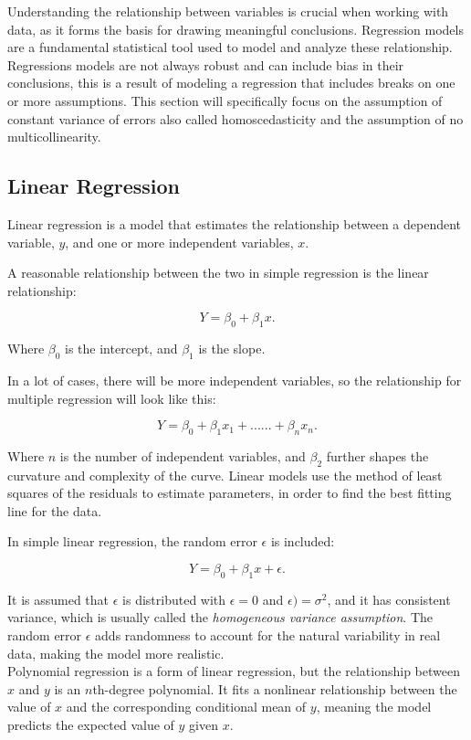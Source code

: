 Understanding the relationship between variables is crucial when working with data, as it forms the basis for drawing meaningful conclusions. Regression models are a fundamental statistical tool used to model and analyze these relationship. Regressions models are not always robust and can include bias in their conclusions, this is a result of modeling a regression that includes breaks on one or more assumptions. This section will specifically focus on the assumption of constant variance of errors also called homoscedasticity and the assumption of no multicollinearity.


\subsection{Linear Regression}
Linear regression is a model that estimates the relationship between a dependent variable, \( y \), and one or more independent variables, \( x \).

A reasonable relationship between the two in simple regression is the linear relationship:

\[
Y = \beta_0 + \beta_1 x.
\]

Where \( \beta_0 \) is the intercept, and \( \beta_1 \) is the slope.

In a lot of cases, there will be more independent variables, so the relationship for multiple regression will look like this:

\[
Y = \beta_0 + \beta_1 x_1 + ......+ \beta_n x_n.
\]



Where \( n \) is the number of independent variables, and $\beta_2$ further shapes the curvature and complexity of the curve. Linear models use the method of least squares of the residuals to estimate parameters, in order to find the best fitting line for the data.

In simple linear regression, the random error \( \epsilon \) is included:

\[
Y = \beta_0 + \beta_1 x + \epsilon.
\]

It is assumed that \( \epsilon \) is distributed with $\epsilon = 0$ and $\epsilon) = \sigma^2$, and it has consistent variance, which is usually called the \textit{homogeneous variance assumption}. The random error \( \epsilon \) adds randomness to account for the natural variability in real data, making the model more realistic.
\newline\\
Polynomial regression is a form of linear regression, but the relationship between \( x \) and \( y \) is an \( n \)th-degree polynomial. It fits a nonlinear relationship between the value of \( x \) and the corresponding conditional mean of \( y \), meaning the model predicts the expected value of \( y \) given \( x \).

